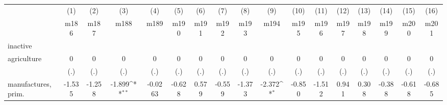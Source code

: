 {
\def\sym#1{\ifmmode^{#1}\else\(^{#1}\)\fi}
\begin{tabular}{l*{16}{c}}
\hline\hline
                    &\multicolumn{1}{c}{(1)}&\multicolumn{1}{c}{(2)}&\multicolumn{1}{c}{(3)}&\multicolumn{1}{c}{(4)}&\multicolumn{1}{c}{(5)}&\multicolumn{1}{c}{(6)}&\multicolumn{1}{c}{(7)}&\multicolumn{1}{c}{(8)}&\multicolumn{1}{c}{(9)}&\multicolumn{1}{c}{(10)}&\multicolumn{1}{c}{(11)}&\multicolumn{1}{c}{(12)}&\multicolumn{1}{c}{(13)}&\multicolumn{1}{c}{(14)}&\multicolumn{1}{c}{(15)}&\multicolumn{1}{c}{(16)}\\
                    &\multicolumn{1}{c}{m186}&\multicolumn{1}{c}{m187}&\multicolumn{1}{c}{m188}&\multicolumn{1}{c}{m189}&\multicolumn{1}{c}{m190}&\multicolumn{1}{c}{m191}&\multicolumn{1}{c}{m192}&\multicolumn{1}{c}{m193}&\multicolumn{1}{c}{m194}&\multicolumn{1}{c}{m195}&\multicolumn{1}{c}{m196}&\multicolumn{1}{c}{m197}&\multicolumn{1}{c}{m198}&\multicolumn{1}{c}{m199}&\multicolumn{1}{c}{m200}&\multicolumn{1}{c}{m201}\\
\hline
inactive            &                     &                     &                     &                     &                     &                     &                     &                     &                     &                     &                     &                     &                     &                     &                     &                     \\
agriculture         &           0         &           0         &           0         &           0         &           0         &           0         &           0         &           0         &           0         &           0         &           0         &           0         &           0         &           0         &           0         &           0         \\
                    &         (.)         &         (.)         &         (.)         &         (.)         &         (.)         &         (.)         &         (.)         &         (.)         &         (.)         &         (.)         &         (.)         &         (.)         &         (.)         &         (.)         &         (.)         &         (.)         \\
[1em]
manufactures, prim. &      -1.535         &      -1.258         &      -1.899\sym{**} &     -0.0263         &      -0.628         &       0.579         &      -0.559         &      -1.373         &      -2.372\sym{*}  &      -0.850         &      -1.512         &       0.941         &       0.308         &      -0.388         &      -0.618         &      -0.685         \\

\end{tabular}}
